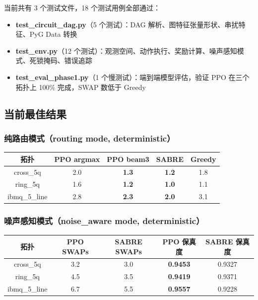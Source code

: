 当前共有 3 个测试文件，18 个测试用例全部通过：

\begin{itemize}
  \item \textbf{test\_circuit\_dag.py}（5 个测试）：DAG 解析、图特征张量形状、串扰特征、PyG Data 转换
  \item \textbf{test\_env.py}（12 个测试）：观测空间、动作执行、奖励计算、噪声感知模式、死锁掩码、错误追踪
  \item \textbf{test\_eval\_phase1.py}（1 个慢测试）：端到端模型评估，验证 PPO 在三个拓扑上 100\% 完成，SWAP 数低于 Greedy
\end{itemize}

\subsection{当前最佳结果}

\subsubsection{纯路由模式（routing mode, deterministic）}

\begin{center}
\begin{tabular}{|c|c|c|c|c|}
\hline
拓扑 & PPO argmax & PPO beam3 & SABRE & Greedy \\
\hline
cross\_5q & 2.0 & \textbf{1.3} & \textbf{1.2} & 1.8 \\
ring\_5q & 1.6 & \textbf{1.2} & \textbf{1.0} & 1.1 \\
ibmq\_5\_line & 2.8 & \textbf{2.3} & \textbf{2.0} & 3.1 \\
\hline
\end{tabular}
\end{center}

\subsubsection{噪声感知模式（noise\_aware mode, deterministic）}

\begin{center}
\begin{tabular}{|c|c|c|c|c|}
\hline
拓扑 & PPO SWAPs & SABRE SWAPs & PPO 保真度 & SABRE 保真度 \\
\hline
cross\_5q & 3.2 & 3.0 & \textbf{0.9453} & 0.9327 \\
ring\_5q & 4.5 & 3.5 & \textbf{0.9419} & 0.9371 \\
ibmq\_5\_line & 6.7 & 5.5 & \textbf{0.9557} & 0.9228 \\
\hline
\end{tabular}
\end{center}

